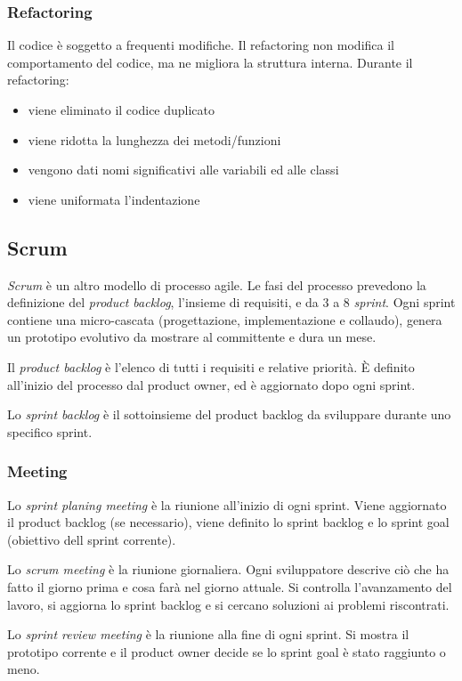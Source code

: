 \documentclass[11pt]{article}
\begin{document}
\subsubsection*{Refactoring}
Il codice è soggetto a frequenti modifiche. Il refactoring non modifica il comportamento del codice, ma ne migliora la 
struttura interna.
Durante il refactoring:
\begin{itemize}
    \item viene eliminato il codice duplicato
    \item viene ridotta la lunghezza dei metodi/funzioni 
    \item vengono dati nomi significativi alle variabili ed alle classi 
    \item viene uniformata l'indentazione 
\end{itemize}
\subsection{Scrum}
\textit{Scrum} è un altro modello di processo agile. Le fasi del processo prevedono la definizione del \textit{product
backlog}, l'insieme di requisiti, e da 3 a 8 \textit{sprint}. Ogni sprint contiene una micro-cascata (progettazione, 
implementazione e collaudo), genera un prototipo evolutivo da mostrare al committente e dura un mese.

Il \textit{product backlog} è l'elenco di tutti i requisiti e relative priorità. È definito all'inizio del processo dal 
product owner, ed è aggiornato dopo ogni sprint.

Lo \textit{sprint backlog} è il sottoinsieme del product backlog da sviluppare durante uno specifico sprint.
\subsubsection*{Meeting}
Lo \textit{sprint planing meeting} è la riunione all'inizio di ogni sprint. Viene aggiornato il product backlog (se 
necessario), viene definito lo sprint backlog e lo sprint goal (obiettivo dell sprint corrente).

Lo \textit{scrum meeting} è la riunione giornaliera. Ogni sviluppatore descrive ciò che ha fatto il giorno prima e cosa 
farà nel giorno attuale. Si controlla l'avanzamento del lavoro, si aggiorna lo sprint backlog e si cercano soluzioni ai 
problemi riscontrati.

Lo \textit{sprint review meeting} è la riunione alla fine di ogni sprint. Si mostra il prototipo corrente e il product 
owner decide se lo sprint goal è stato raggiunto o meno.
\end{document}
